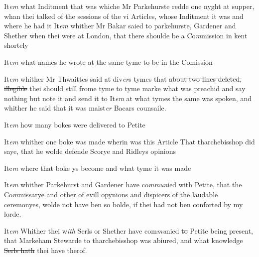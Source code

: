 \documentclass[12pt, a4paper]{book}
\begin{document}
		\ifthenelse{\isodd{\thepage}}
		{\reversemarginpar}
		{\normalmarginpar}
		It\textit{em} what Inditment that was whiche Mr Parkehurste redde one nyght at supper, whan thei talked of the sessions of the vi Articles, whose Inditment it was and where he had it It\textit{em}
 		whither 
			Mr Bakar saied to parkehurste, Gardener and Shether when thei were at London, that there shoulde be a Co\textit{m}mission in kent shortely
 	
		\ifthenelse{\isodd{\thepage}}
		{\reversemarginpar}
		{\normalmarginpar}
		It\textit{em} what names he wrote at the same tyme to be in the Comission
 	
		\ifthenelse{\isodd{\thepage}}
		{\reversemarginpar}
		{\normalmarginpar}
		It\textit{em} whither Mr Thwaittes said at div\textit{er}s tymes that
			\sout{about two lines deleted, illegible}
               thei should still frome tyme to tyme marke what was preachid and say nothing but note it and send it to  It\textit{em} at what tymes the same was spoken, and whither he said that it was maist\textit{er} Bacars counsaile.
 	
		\ifthenelse{\isodd{\thepage}}
		{\reversemarginpar}
		{\normalmarginpar}
		It\textit{em} how many bokes were delivered to Petite
 	
		\ifthenelse{\isodd{\thepage}}
		{\reversemarginpar}
		{\normalmarginpar}
		It\textit{em} whither one boke was made wherin was this Article That tharchebisshop did saye, that he wolde defende Scorye and  Ridleys opinions
 	
		\ifthenelse{\isodd{\thepage}}
		{\reversemarginpar}
		{\normalmarginpar}
		Ite\textit{m} where that boke ys become and what tyme it was made
 	
		\ifthenelse{\isodd{\thepage}}
		{\reversemarginpar}
		{\normalmarginpar}
		It\textit{em} whither Parkehurst and Gardener have co\textit{mmun}ied with Petite, that the Co\textit{m}missarye and other of evill opynions and dispicers of the laudable ceremonyes, wolde not have ben so bolde, if thei had not ben conforted by my lorde.
 		
 			
		\ifthenelse{\isodd{\thepage}}
		{\reversemarginpar}
		{\normalmarginpar}
		It\textit{em} Whither thei w\textit{ith} Serls or Shether have com\textit{mu}nied \sout{to }Petite being present, that Markeham Stewarde to tharchebisshop was abiured, and what knowledge \sout{Serls hath}
               thei have
			 therof.
 	
\end{document}
